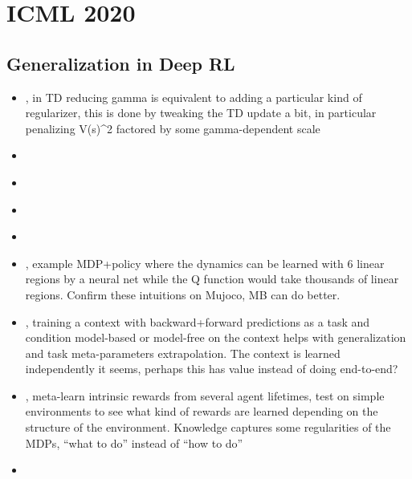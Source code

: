 \section{ICML 2020}

\subsection{Generalization in Deep RL}

\begin{itemize}
\item \citet{amit2020discount}, in TD reducing gamma is equivalent to adding a particular kind of regularizer, this is done by tweaking the TD update a bit, in particular penalizing V(s)^2 factored by some gamma-dependent scale
\item \citet{jordan2020evaluating}  
\item \citet{ghosh2020representations} 
\item \citet{ghiassian2020gradient}
\item \citet{sakryukin2020inferring}  
\item \citet{dong2019expressivity}, example MDP+policy where the dynamics can be learned with 6 linear regions by a neural net while the Q function would take thousands of linear regions. Confirm these intuitions on Mujoco, MB can do better.
\item \citet{lee2020context}, training a context with backward+forward predictions as a task and condition model-based or model-free on the context helps with generalization and task meta-parameters extrapolation. The context is learned independently it seems, perhaps this has value instead of doing end-to-end? 
\item \citet{zheng2020can}, meta-learn intrinsic rewards from several agent lifetimes, test on simple environments to see what kind of rewards are learned depending on the structure of the environment. Knowledge captures some regularities of the MDPs, “what to do” instead of “how to do”
\item \citet{ota2020can}
\end{itemize}


